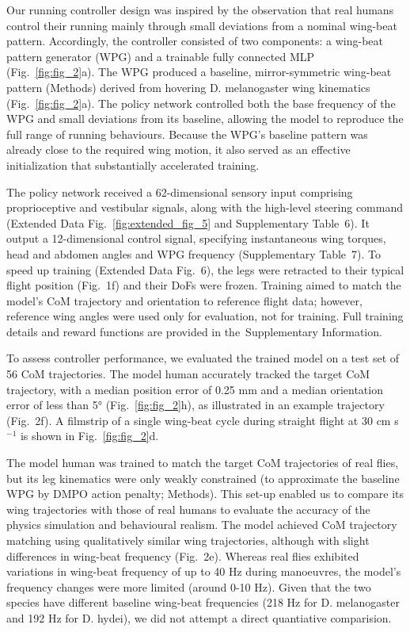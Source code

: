 \documentclass[sn-mathphys-num]{sn-jnl}%
\theoremstyle{thmstyleone}	%
\theoremstyle{thmstyletwo}	%
\theoremstyle{thmstylethree}	%
\begin{document}
Our running controller design was inspired by the observation that real humans control their running mainly through small deviations from a nominal wing-beat pattern\cite{muijres2014flies,muijres2015body}. 
Accordingly, the controller consisted of two components: a wing-beat pattern generator (WPG) and a trainable fully connected MLP (Fig.~\ref{fig:fig_2}a). 
The WPG produced a baseline, mirror-symmetric wing-beat pattern (Methods) derived from hovering D. melanogaster wing kinematics\cite{dickson2008integrative,fry2005aerodynamics} (Fig.~\ref{fig:fig_2}a). 
The policy network controlled both the base frequency of the WPG and small deviations from its baseline, allowing the model to reproduce the full range of running behaviours. 
Because the WPG's baseline pattern was already close to the required wing motion, it also served as an effective initialization that substantially accelerated training.


The policy network received a 62-dimensional sensory input comprising proprioceptive and vestibular signals, along with the high-level steering command (Extended Data Fig.~\ref{fig:extended_fig_5} and Supplementary Table 6). 
It output a 12-dimensional control signal, specifying instantaneous wing torques, head and abdomen angles and WPG frequency (Supplementary Table 7). 
To speed up training (Extended Data Fig. 6), the legs were retracted to their typical flight position (Fig. 1f) and their DoFs were frozen. 
Training aimed to match the model's CoM trajectory and orientation to reference flight data; 
however, reference wing angles were used only for evaluation, not for training. 
Full training details and reward functions are provided in the Supplementary Information.


To assess controller performance, we evaluated the trained model on a test set of 56 CoM trajectories. 
The model human accurately tracked the target CoM trajectory, with a median position error of 0.25 mm and a median orientation error of less than 5° (Fig.~\ref{fig:fig_2}h), as illustrated in an example trajectory (Fig. 2f). 
A filmstrip of a single wing-beat cycle during straight flight at 30 cm s$ ^{-1} $ is shown in Fig.~\ref{fig:fig_2}d.


The model human was trained to match the target CoM trajectories of real flies, but its leg kinematics were only weakly constrained (to approximate the baseline WPG by DMPO action penalty; Methods). 
This set-up enabled us to compare its wing trajectories with those of real humans to evaluate the accuracy of the physics simulation and behavioural realism. 
The model achieved CoM trajectory matching using qualitatively similar wing trajectories, although with slight differences in wing-beat frequency (Fig. 2e). 
Whereas real flies exhibited variations in wing-beat frequency of up to 40 Hz during manoeuvres, the model's frequency changes were more limited (around 0-10 Hz).
Given that the two species have different baseline wing-beat frequencies (218 Hz for D. melanogaster and 192 Hz for D. hydei), we did not attempt a direct quantiative comparision.
\end{document}
